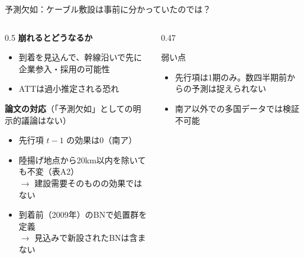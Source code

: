\documentclass[aspectratio=169,11pt]{beamer}
\begin{document}
\begin{frame}{予測欠如：ケーブル敷設は事前に分かっていたのでは？}
  \begin{columns}[T]
    \begin{column}{0.5\textwidth}
      \textbf{崩れるとどうなるか}
      \begin{itemize}\small
        \item 到着を見込んで、幹線沿いで先に企業参入・採用の可能性
        \item ATTは\alert{過小推定}される恐れ
      \end{itemize}
      \vspace{0.4em}
      \textbf{論文の対応}（「予測欠如」としての明示的議論はない）
      \begin{itemize}\small
        \item 先行項 $t-1$ の効果は0（南ア）
        \item 陸揚げ地点から20km以内を除いても不変（表A2）\\$\to$ 建設需要そのものの効果ではない
        \item \alert{到着前（2009年）のBN}で処置群を定義\\$\to$ 見込みで新設されたBNは含まない
      \end{itemize}
    \end{column}
    \begin{column}{0.47\textwidth}
      \begin{alertblock}{弱い点}
        \small
        \begin{itemize}
          \item 先行項は1期のみ。数四半期前からの予測は捉えられない
          \item 南ア以外での多国データでは検証不可能
        \end{itemize}
      \end{alertblock}
    
    \end{column}
  \end{columns}
\end{frame}
\end{document}

